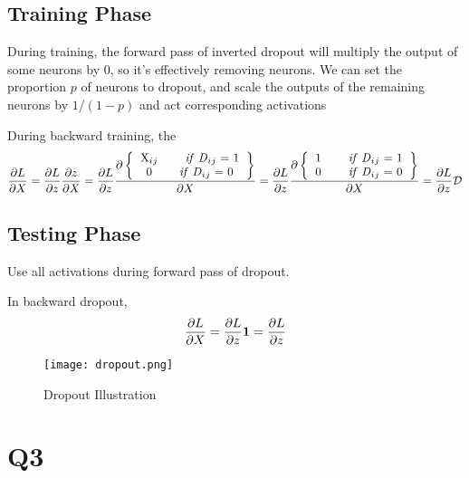 \documentclass[12pt, a4paper]{article}
\begin{document}
\subsection* {Training Phase}
During training, the forward pass of inverted dropout will multiply the output of some neurons by 0, so it's effectively removing neurons. We can set the proportion $p$ of neurons to dropout, and scale the outputs of the remaining neurons by $1/(1-p)$ and act corresponding activations\par
During backward training, the 
\[ \frac{\partial L}{\partial X} = \frac{\partial L}{\partial z} \frac{\partial z}{\partial X} =
\frac{\partial L}{\partial z} \frac{\partial 
\left \{
  \begin{tabular}{ccc}
  X$_i$$_j$ \qquad  \textit{if}  \textit{D}$_i$$_j$ = 1 \\
  0 \qquad \textit{if} \textit{D}$_i$$_j$ = 0 \\
  \end{tabular}
\right \}
}{\partial X} 
= 
\frac{\partial L}{\partial z} \frac{\partial 
\left \{
  \begin{tabular}{ccc}
  1 \qquad \textit{if}  \textit{D}$_i$$_j$ = 1 \\
  0 \qquad  \textit{if} \textit{D}$_i$$_j$ = 0 \\
  \end{tabular}
\right \}
}{\partial X}
= \frac{\partial L}{\partial z}\mathcal{D}
\]
\subsection* {Testing Phase}
Use all activations during forward pass of dropout.\par 
In backward dropout, \[ 
\frac{\partial L}{\partial X} = \frac{\partial L}{\partial z} \bm{1}= \frac{\partial L}{\partial z} \]

\begin{figure}
\centering
\texttt{[image: dropout.png]}
\caption{Dropout Illustration}
\end{figure}

\section*{Q3}
\end{document}
